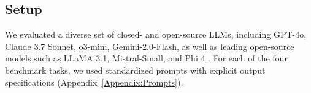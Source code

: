 \documentclass{article} %
\begin{document}

\subsection{Setup}
We evaluated a diverse set of closed- and open-source LLMs, including GPT-4o, Claude 3.7 Sonnet, o3-mini, Gemini-2.0-Flash, as well as leading open-source models such as LLaMA 3.1, Mistral-Small, and Phi 4 \citep{team2025gemma,grattafiori2024llama,zhu2024deepseek,abdin2024phi,jiang2023mistral7b}.
For each of the four benchmark tasks, we used standardized prompts with explicit output specifications (Appendix~\ref{Appendix:Prompts}).
\end{document}
